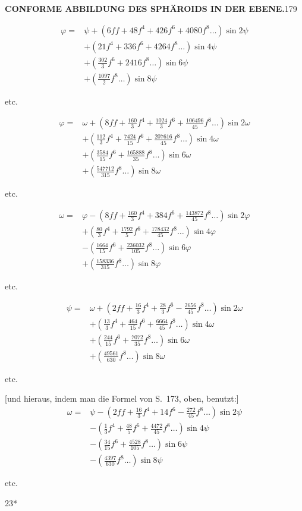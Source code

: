 \par\clearpage
\noindent\null\hfill{\small\textbf{CONFORME ABBILDUNG DES SPHÄROIDS IN DER EBENE.}}\hfill179\par\medskip
\[
\begin{aligned}
\varphi={}&\psi+(6ff+48f^4+426f^6+4080f^8\ldots)\sin2\psi\\
&+(21f^4+336f^6+4264f^8\ldots)\sin4\psi\\
&+(\tfrac{302}{3}f^6+2416f^8\ldots)\sin6\psi\\
&+(\tfrac{1097}{2}f^8\ldots)\sin8\psi
\end{aligned}
\]
{\centering etc.\par}
\[
\begin{aligned}
\varphi={}&\omega+(8ff+\tfrac{160}{3}f^4+\tfrac{1024}{3}f^6+\tfrac{106496}{45}f^8\ldots)\sin2\omega\\
&+(\tfrac{112}{3}f^4+\tfrac{7424}{15}f^6+\tfrac{207616}{45}f^8\ldots)\sin4\omega\\
&+(\tfrac{3584}{15}f^6+\tfrac{165888}{35}f^8\ldots)\sin6\omega\\
&+(\tfrac{547712}{315}f^8\ldots)\sin8\omega
\end{aligned}
\]
{\centering etc.\par}
\[
\begin{aligned}
\omega={}&\varphi-(8ff+\tfrac{160}{3}f^4+384f^6+\tfrac{143872}{45}f^8\ldots)\sin2\varphi\\
&+(\tfrac{80}{3}f^4+\tfrac{1792}{5}f^6+\tfrac{178432}{45}f^8\ldots)\sin4\varphi\\
&-(\tfrac{1664}{15}f^6+\tfrac{236032}{105}f^8\ldots)\sin6\varphi\\
&+(\tfrac{158336}{315}f^8\ldots)\sin8\varphi
\end{aligned}
\]
{\centering etc.\par}
\[
\begin{aligned}
\psi={}&\omega+(2ff+\tfrac{16}{3}f^4+\tfrac{28}{3}f^6-\tfrac{2656}{45}f^8\ldots)\sin2\omega\\
&+(\tfrac{13}{3}f^4+\tfrac{464}{15}f^6+\tfrac{6664}{45}f^8\ldots)\sin4\omega\\
&+(\tfrac{244}{15}f^6+\tfrac{7072}{35}f^8\ldots)\sin6\omega\\
&+(\tfrac{49561}{630}f^8\ldots)\sin8\omega
\end{aligned}
\]
{\centering etc.\par}
[und hieraus, indem man die Formel von S.~173, oben, benutzt:]
\[
\begin{aligned}
\omega={}&\psi-(2ff+\tfrac{16}{3}f^4+14f^6-\tfrac{272}{45}f^8\ldots)\sin2\psi\\
&-(\tfrac13f^4+\tfrac{48}{5}f^6+\tfrac{4472}{45}f^8\ldots)\sin4\psi\\
&-(\tfrac{34}{15}f^6+\tfrac{4528}{105}f^8\ldots)\sin6\psi\\
&-(\tfrac{4397}{630}f^8\ldots)\sin8\psi
\end{aligned}
\]
{\centering etc.\par}
\par\noindent\null\hfill{\small23*}\hspace*{.12\linewidth}\par


